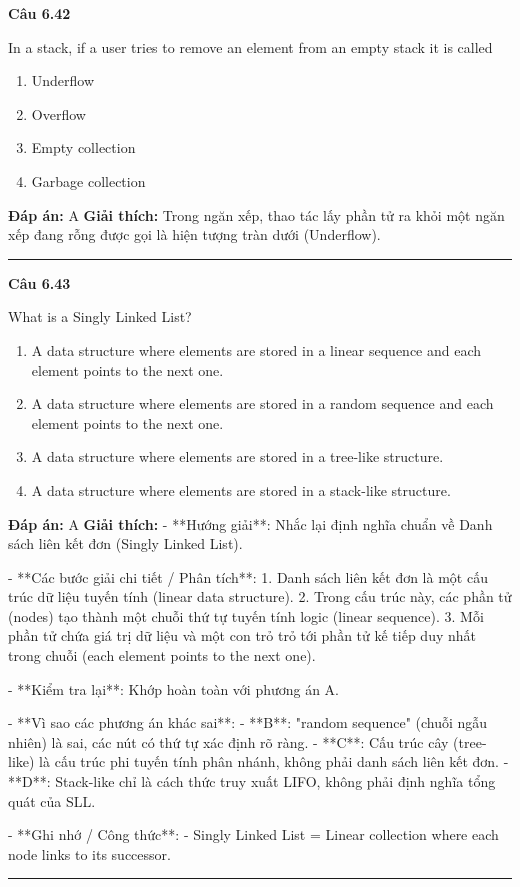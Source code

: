 \documentclass[11pt,a4paper]{article}
\newenvironment{question}[1]{%
  \par\vspace{1em}\noindent\textbf{\large Câu #1}\par\vspace{0.4em}
}{%
  \par\vspace{1em}\hrule\vspace{0.6em}
}
\newenvironment{choices}{%
  \begin{enumerate}[label=\textbf{\Alph*.},leftmargin=2.2em,itemsep=2pt,topsep=3pt]
}{%
  \end{enumerate}
}
\newcommand{\choice}{\item}
\begin{document}
\begin{question}{6.42}
In a stack, if a user tries to remove an element from an empty stack it is called
\begin{choices}
\choice Underflow
\choice Overflow
\choice Empty collection
\choice Garbage collection
\end{choices}
\textbf{Đáp án:} A
\textbf{Giải thích:} Trong ngăn xếp, thao tác lấy phần tử ra khỏi một ngăn xếp đang rỗng được gọi là hiện tượng tràn dưới (Underflow).
\end{question}

\begin{question}{6.43}
What is a Singly Linked List?
\begin{choices}
\choice A data structure where elements are stored in a linear sequence and each element points to the next one.
\choice A data structure where elements are stored in a random sequence and each element points to the next one.
\choice A data structure where elements are stored in a tree-like structure.
\choice A data structure where elements are stored in a stack-like structure.
\end{choices}
\textbf{Đáp án:} A
\textbf{Giải thích:} - **Hướng giải**:
  Nhắc lại định nghĩa chuẩn về Danh sách liên kết đơn (Singly Linked List).

- **Các bước giải chi tiết / Phân tích**:
  1. Danh sách liên kết đơn là một cấu trúc dữ liệu tuyến tính (linear data structure).
  2. Trong cấu trúc này, các phần tử (nodes) tạo thành một chuỗi thứ tự tuyến tính logic (linear sequence).
  3. Mỗi phần tử chứa giá trị dữ liệu và một con trỏ trỏ tới phần tử kế tiếp duy nhất trong chuỗi (each element points to the next one).

- **Kiểm tra lại**:
  Khớp hoàn toàn với phương án A.

- **Vì sao các phương án khác sai**:
  - **B**: "random sequence" (chuỗi ngẫu nhiên) là sai, các nút có thứ tự xác định rõ ràng.
  - **C**: Cấu trúc cây (tree-like) là cấu trúc phi tuyến tính phân nhánh, không phải danh sách liên kết đơn.
  - **D**: Stack-like chỉ là cách thức truy xuất LIFO, không phải định nghĩa tổng quát của SLL.

- **Ghi nhớ / Công thức**:
  - Singly Linked List = Linear collection where each node links to its successor.
\end{question}
\end{document}
